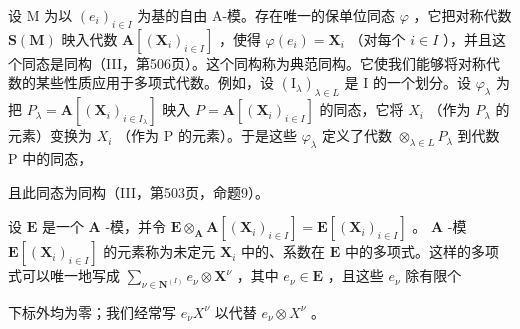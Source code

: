 设 M 为以 \((e_{i})_{i\in I}\) 为基的自由 A-模。存在唯一的保单位同态 \(\varphi\) ，它把对称代数 \(\mathbf{S}(\mathbf{M})\) 映入代数 \(\mathbf{A}[(\mathbf{X}_{i})_{i\in I}]\) ，使得 \(\varphi(e_{i})=\mathbf{X}_{i}\) （对每个 \(i\in I\) ），并且这个同态是同构（III，第506页）。这个同构称为典范同构。它使我们能够将对称代数的某些性质应用于多项式代数。例如，设 \((\mathrm{I}_{\lambda})_{\lambda\in L}\) 是 I 的一个划分。设 \(\varphi_{\lambda}\) 为把 \(P_{\lambda}=\mathbf{A}[(\mathbf{X}_{i})_{i\in I_{\lambda}}]\) 映入 \(P=\mathbf{A}[(\mathbf{X}_{i})_{i\in I}]\) 的同态，它将 \(X_{i}\) （作为 \(P_{\lambda}\) 的元素）变换为 \(X_{i}\) （作为 P 的元素）。于是这些 \(\varphi_{\lambda}\) 定义了代数 \(\otimes_{\lambda\in L}P_{\lambda}\) 到代数 P 中的同态，

且此同态为同构（III，第503页，命题9）。

设 \(\mathbf{E}\) 是一个 \(\mathbf{A}\) -模，并令 \(\mathbf{E} \otimes_{\mathbf{A}} \mathbf{A}[(\mathbf{X}_i)_{i \in I}] = \mathbf{E}[(\mathbf{X}_i)_{i \in I}]\) 。 \(\mathbf{A}\) -模 \(\mathbf{E}[(\mathbf{X}_i)_{i \in I}]\) 的元素称为未定元 \(\mathbf{X}_i\) 中的、系数在 \(\mathbf{E}\) 中的多项式。这样的多项式可以唯一地写成 \(\sum_{\nu \in \mathbf{N}^{(I)}} e_\nu \otimes \mathbf{X}^\nu\) ，其中 \(e_\nu \in \mathbf{E}\) ，且这些 \(e_\nu\) 除有限个

下标外均为零；我们经常写 \(e_{\nu}X^{\nu}\) 以代替 \(e_{\nu}\otimes X^{\nu}\) 。

